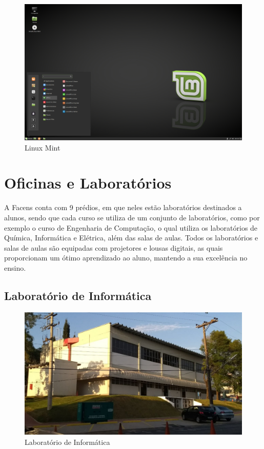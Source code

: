 \documentclass[
	12pt,				%
	oneside,			%
	a4paper,			%
	chapter=TITLE,		%
	section=TITLE,		%
	sumario=tradicional %
	english,			%
	french,				%
	spanish,			%
	brazil				%
	]{abntex2}
\begin{document}
\begin{figure}[htb]
	\caption{\label{fig:linux} Linux Mint}
	\begin{center}
		\includegraphics[scale=0.3]{linux}
	\end{center}
\end{figure}


\section{Oficinas e Laboratórios}
\label{sec:oficlabs}
A Facens conta com 9 prédios, em que neles estão laboratórios destinados a alunos, sendo que cada curso se utiliza de um conjunto de laboratórios, como por exemplo o curso de Engenharia de Computação, o qual utiliza os laboratórios de Química, Informática e Elétrica, além das salas de aulas. Todos os laboratórios e salas de aulas são equipadas com projetores e lousas digitais, as quais proporcionam um ótimo aprendizado ao aluno, mantendo a sua excelência no ensino.

\subsection{Laboratório de Informática}

\begin{figure}[htb]
	\caption{\label{fig:li} Laboratório de Informática}
	\begin{center}
		\includegraphics[scale=0.3]{li}
	\end{center}
\end{figure}
\end{document}
